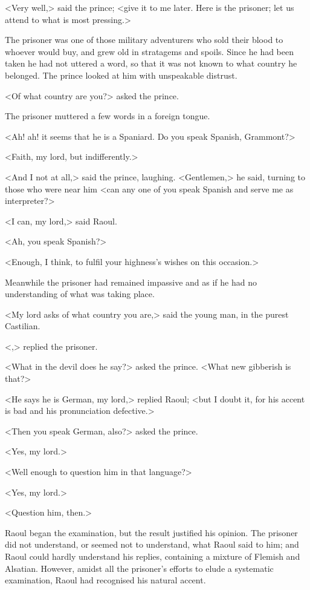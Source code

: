 <Very well,> said the prince; <give it to me later. Here is the prisoner; let us attend to what is most pressing.>

The prisoner was one of those military adventurers who sold their blood to whoever would buy, and grew old in stratagems and spoils. Since he had been taken he had not uttered a word, so that it was not known to what country he belonged. The prince looked at him with unspeakable distrust.

<Of what country are you?> asked the prince.

The prisoner muttered a few words in a foreign tongue.

<Ah! ah! it seems that he is a Spaniard. Do you speak Spanish, Grammont?>

<Faith, my lord, but indifferently.>

<And I not at all,> said the prince, laughing. <Gentlemen,> he said, turning to those who were near him <can any one of you speak Spanish and serve me as interpreter?>

<I can, my lord,> said Raoul.

<Ah, you speak Spanish?>

<Enough, I think, to fulfil your highness's wishes on this occasion.>

Meanwhile the prisoner had remained impassive and as if he had no understanding of what was taking place.

<My lord asks of what country you are,> said the young man, in the purest Castilian.

<,> replied the prisoner.

<What in the devil does he say?> asked the prince. <What new gibberish is that?>

<He says he is German, my lord,> replied Raoul; <but I doubt it, for his accent is bad and his pronunciation defective.>

<Then you speak German, also?> asked the prince.

<Yes, my lord.>

<Well enough to question him in that language?>

<Yes, my lord.>

<Question him, then.>

Raoul began the examination, but the result justified his opinion. The prisoner did not understand, or seemed not to understand, what Raoul said to him; and Raoul could hardly understand his replies, containing a mixture of Flemish and Alsatian. However, amidst all the prisoner's efforts to elude a systematic examination, Raoul had recognised his natural accent.

